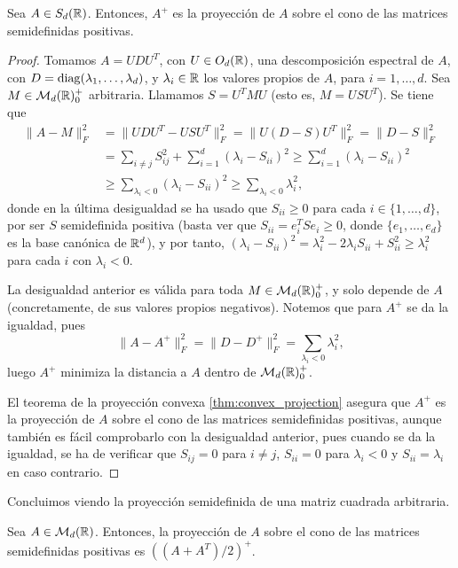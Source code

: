 \begin{thm}
    Sea $A \in S_d(\mathbb{R})$. Entonces, $A^+$ es la proyección de $A$ sobre el cono de las matrices semidefinidas positivas.
\end{thm}

\begin{proof}
    Tomamos $A = UDU^T$, con $U \in O_d(\mathbb{R})$, una descomposición espectral de $A$, con $D = \operatorname{diag}(\lambda_1,\dots,\lambda_d)$, y $\lambda_i \in \mathbb{R}$ los valores propios de $A$, para $i = 1,\dots,d$. Sea $M \in \mathcal{M}_d(\mathbb{R})^+_0$ arbitraria. Llamamos $S = U^TMU$ (esto es, $M = USU^T$). Se tiene que
    \begin{align*}
        \|A - M\|_F^2 &=\|UDU^T - USU^T\|_F^2 = \|U(D-S)U^T\|_F^2 = \|D-S\|_F^2 \\
                     &= \sum_{i \ne j} S_{ij}^2 + \sum_{i=1}^d (\lambda_i - S_{ii})^2 \ge \sum_{i=1}^d (\lambda_i - S_{ii})^2 \\
                     &\ge \sum_{\lambda_i < 0} (\lambda_ i - S_{ii})^2 \ge \sum_{\lambda_i < 0} \lambda_i^2,   
    \end{align*}
    donde en la última desigualdad se ha usado que $S_{ii} \ge 0$ para cada $i \in \{1,\dots,d\}$, por ser $S$ semidefinida positiva (basta ver que $S_{ii} = e_i^TSe_i \ge 0$, donde $\{e_1,\dots,e_d\}$ es la base canónica de $\mathbb{R}^d$), y por tanto, $(\lambda_i - S_{ii})^2 = \lambda_i^2 - 2\lambda_iS_{ii} + S_{ii}^2 \ge \lambda_i^2$ para cada $i$ con $\lambda_i < 0$.

    La desigualdad anterior es válida para toda $M \in \mathcal{M}_d(\mathbb{R})^+_0$, y solo depende de $A$ (concretamente, de sus valores propios negativos). Notemos que para $A^+$ se da la igualdad, pues
    \[\|A - A^+\|_F^2 = \|D - D^+\|_F^2 = \sum_{\lambda_i < 0} \lambda_i^2, \]
    luego $A^+$ minimiza la distancia a $A$ dentro de $\mathcal{M}_d(\mathbb{R})^+_0$.

    El teorema de la proyección convexa \ref{thm:convex_projection} asegura que $A^+$ es la proyección de $A$ sobre el cono de las matrices semidefinidas positivas, aunque también es fácil comprobarlo con la desigualdad anterior, pues cuando se da la igualdad, se ha de verificar que $S_{ij} = 0$ para $i \ne j$, $S_{ii} = 0$ para $\lambda_i < 0$ y $S_{ii} = \lambda_i$ en caso contrario.
\end{proof}

Concluimos viendo la proyección semidefinida de una matriz cuadrada arbitraria.

\begin{cor}
    Sea $A \in \mathcal{M}_d(\mathbb{R})$. Entonces, la proyección de $A$ sobre el cono de las matrices semidefinidas positivas es $((A + A^T)/2)^+$.
\end{cor}

